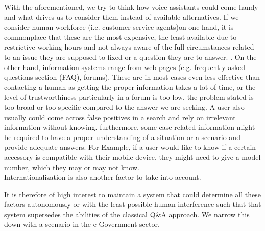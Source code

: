 With the aforementioned, we try to think how voice assistants could come handy and what drives us to consider them instead of available alternatives.
If we consider human workforce (i.e. customer service agents)on one hand, it is commonplace that these are the most expensive, the least available due to restrictive working hours and not always aware of the full circumstances related to an issue they are supposed to fixed or a question they are to answer. .
On the other hand, information systems range from web pages (e.g. frequently asked questions section (FAQ), forums). These are in most cases even less effective than contacting a human as getting the proper information takes a lot of time, or the level of trustworthiness particularly in a forum is too low, the problem stated is too broad or too specific compared to the answer we are seeking. A user also usually could come across false positives in a search and rely on irrelevant information without knowing.
furthermore, some case-related information might be required to have a proper understanding of a situation or a scenario and provide adequate answers. For Example, if a user would like to know if a certain accessory is compatible with their mobile device, they might need to give a model number, which they may or may not know.\\

Internationalization is also another factor to take into account.

It is therefore of high interest to maintain a system that could determine all these factors autonomously or with the least possible human interference such that that system supersedes the abilities of the classical Q\&A approach. We narrow this down with a scenario in the e-Government sector. \\

